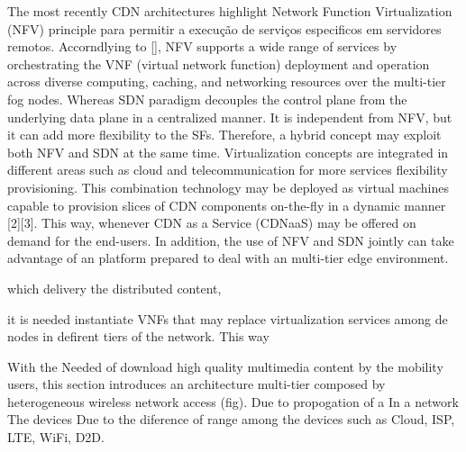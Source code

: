 The most recently CDN architectures highlight Network Function Virtualization (NFV) principle para permitir a execução de serviços especificos em servidores remotos. Accorndlying to [], NFV supports a wide range of services by orchestrating the VNF (virtual network function) deployment and operation across diverse computing, caching, and networking resources over the multi-tier fog nodes. Whereas SDN  paradigm decouples the control plane from the underlying data plane in a centralized manner. It is independent from NFV, but it can add more flexibility to the SFs. Therefore, a  hybrid  concept  may  exploit  both  NFV  and  SDN  at  the same  time.  Virtualization  concepts  are  integrated  in  different areas such as cloud and telecommunication for more services flexibility provisioning. This combination technology may be deployed as virtual machines capable to provision slices of CDN components on-the-fly in a dynamic manner [2][3]. This way, whenever CDN as a Service (CDNaaS) may be offered on demand for the end-users. In addition, the use of NFV and SDN jointly can take advantage of an platform prepared to deal with an multi-tier edge environment. %


which delivery the distributed content,

it is needed instantiate VNFs that may replace virtualization services among de nodes in defirent tiers of the network. This way 

With the Needed of download high quality multimedia content by the mobility users, this section introduces an architecture multi-tier composed by heterogeneous wireless network access (fig). Due to propogation of a In a network The devices  Due to the diference of range among the devices such as Cloud, ISP, LTE, WiFi, D2D. 

